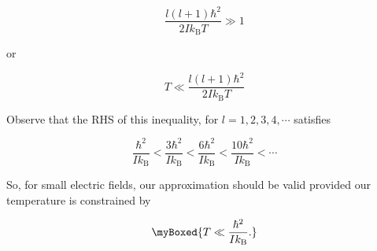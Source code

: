 {\begin{equation}\label{eqn:basicStatMechProblemSet5Problem3:640}
\frac{l(l+1) \hbar^2}{2 I k_{\mathrm{B}} T} \gg 1
\end{equation}

or

\begin{equation}\label{eqn:basicStatMechProblemSet5Problem3:660}
T \ll \frac{l(l+1) \hbar^2}{2 I k_{\mathrm{B}} T} 
\end{equation}

Observe that the RHS of this inequality, for $l = 1, 2, 3, 4, \cdots$ satisfies

\begin{equation}\label{eqn:basicStatMechProblemSet5Problem3:680}
\frac{\hbar^2 }{I k_{\mathrm{B}}}
<
\frac{3 \hbar^2 }{I k_{\mathrm{B}}}
<
\frac{6 \hbar^2 }{I k_{\mathrm{B}}}
<
\frac{10 \hbar^2 }{I k_{\mathrm{B}}}
< \cdots
\end{equation}

So, for small electric fields, our approximation should be valid provided our temperature is constrained by

\begin{equation}\label{eqn:basicStatMechProblemSet5Problem3:700}
\myBoxed{
T \ll \frac{\hbar^2 }{I k_{\mathrm{B}}}.
}
\end{equation}
}
